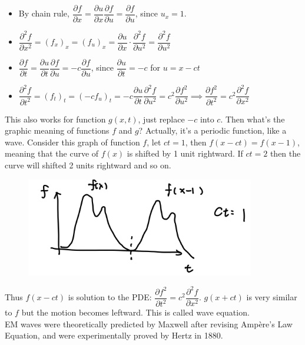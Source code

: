 \documentclass[12pt,a4paper,twoside]{article}
\numberwithin{equation}{section}
\begin{document}
\begin{itemize}
    \item By chain rule, $\dfrac{\partial f}{\partial x}=\dfrac{\partial u}{\partial x}\dfrac{\partial f}{\partial u}=\dfrac{\partial f}{\partial u}$, since $u_x=1$.
    \item $\dfrac{\partial^2 f}{\partial x^2}=(f_x)_x=(f_u)_x=\dfrac{\partial u}{\partial x}\cdot \dfrac{\partial^2 f}{\partial u^2}=\dfrac{\partial^2 f}{\partial u^2}$
    \item $\dfrac{\partial f}{\partial t}=\dfrac{\partial u}{\partial t}\dfrac{\partial f}{\partial u}=-c\dfrac{\partial f}{\partial u}$, since $\dfrac{\partial u}{\partial t}=-c$ for $u=x-ct$
    \item $\dfrac{\partial^2 f}{\partial t^2}=(f_t)_t=(-cf_u)_t=-c\dfrac{\partial u}{\partial t}\dfrac{\partial^2f}{\partial u^2}=c^2\dfrac{\partial f^2}{\partial u^2}\implies \dfrac{\partial f^2}{\partial t^2}=c^2\dfrac{\partial^2 f}{\partial x^2}$
\end{itemize}
This also works for function $g(x,t)$, just replace $-c$ into $c$. Then what's the graphic meaning of functions $f$ and $g$? Actually, it's a periodic function, like a wave. Consider this graph of function $f$, let $ct=1$, then $f(x-ct)=f(x-1)$, meaning that the curve of $f(x)$ is shifted by 1 unit rightward. If $ct=2$ then the curve will shifted 2 units rightward and so on.
\begin{figure}[ht]
    \centering
    \includegraphics[width=10cm]{250-Revision/wave-f.png}
\end{figure}

\noindent Thus $f(x-ct)$ is solution to the PDE: $\dfrac{\partial f^2}{\partial t^2}=c^2\dfrac{\partial^2 f}{\partial x^2}$. $g(x+ct)$ is very similar to $f$ but the motion becomes leftward. This is called wave equation.\\

\noindent EM waves were theoretically predicted by Maxwell after revising Amp\`ere's Law Equation, and were experimentally proved by Hertz in 1880.
\end{document}
